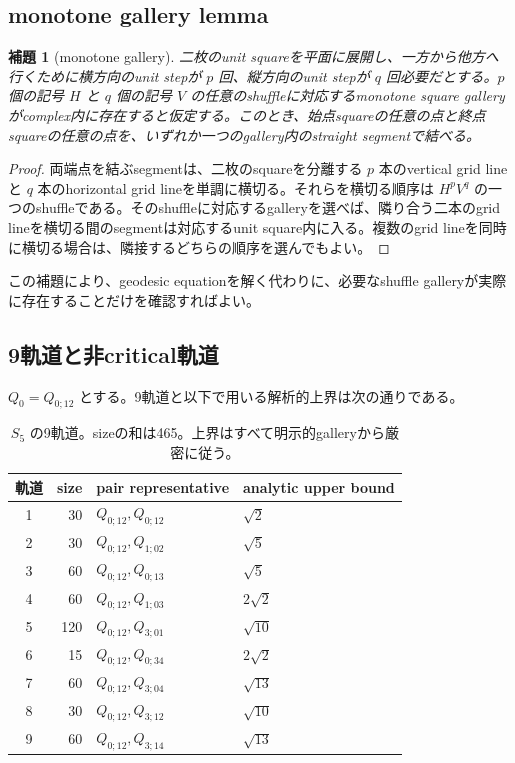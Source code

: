 \documentclass[11pt,a4paper]{ltjsarticle}
\newtheorem{lemma}[theorem]{補題}
\theoremstyle{definition}
\theoremstyle{remark}
\begin{document}
\subsection{monotone gallery lemma}

\begin{lemma}[monotone gallery]\label{lem:monotone-gallery}
二枚のunit squareを平面に展開し、一方から他方へ行くために横方向のunit stepが $p$ 回、縦方向のunit stepが $q$ 回必要だとする。$p$ 個の記号 $H$ と $q$ 個の記号 $V$ の任意のshuffleに対応するmonotone square galleryがcomplex内に存在すると仮定する。このとき、始点squareの任意の点と終点squareの任意の点を、いずれか一つのgallery内のstraight segmentで結べる。
\end{lemma}

\begin{proof}
両端点を結ぶsegmentは、二枚のsquareを分離する $p$ 本のvertical grid lineと $q$ 本のhorizontal grid lineを単調に横切る。それらを横切る順序は $H^pV^q$ の一つのshuffleである。そのshuffleに対応するgalleryを選べば、隣り合う二本のgrid lineを横切る間のsegmentは対応するunit square内に入る。複数のgrid lineを同時に横切る場合は、隣接するどちらの順序を選んでもよい。
\end{proof}

この補題により、geodesic equationを解く代わりに、必要なshuffle galleryが実際に存在することだけを確認すればよい。

\subsection{9軌道と非critical軌道}

$Q_0=Q_{0;12}$ とする。9軌道と以下で用いる解析的上界は次の通りである。
\begin{table}[ht]
\centering
\small
\begin{tabular}{crll}
\toprule
軌道 & size & pair representative & analytic upper bound\\
\midrule
1&30 &$Q_{0;12},Q_{0;12}$ &$\sqrt2$\\
2&30 &$Q_{0;12},Q_{1;02}$ &$\sqrt5$\\
3&60 &$Q_{0;12},Q_{0;13}$ &$\sqrt5$\\
4&60 &$Q_{0;12},Q_{1;03}$ &$2\sqrt2$\\
5&120&$Q_{0;12},Q_{3;01}$ &$\sqrt{10}$\\
6&15 &$Q_{0;12},Q_{0;34}$ &$2\sqrt2$\\
7&60 &$Q_{0;12},Q_{3;04}$ &$\sqrt{13}$\\
8&30 &$Q_{0;12},Q_{3;12}$ &$\sqrt{10}$\\
9&60 &$Q_{0;12},Q_{3;14}$ &$\sqrt{13}$\\
\bottomrule
\end{tabular}
\caption{$S_5$ の9軌道。sizeの和は465。上界はすべて明示的galleryから厳密に従う。}
\label{tab:nine-orbits}
\end{table}
\end{document}
